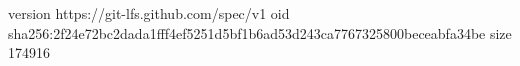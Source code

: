 version https://git-lfs.github.com/spec/v1
oid sha256:2f24e72bc2dada1fff4ef5251d5bf1b6ad53d243ca7767325800beceabfa34be
size 174916
